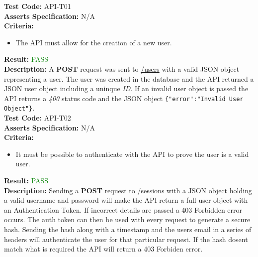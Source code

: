 \documentclass[11pt,a4paper]{report}
\begin{document}
\label{test:API-T01}
\noindent\textbf{Test Code:} API-T01\\
\textbf{Asserts Specification:} N/A \\ 
\textbf{Criteria:} \begin{itemize}
                     \item The API must allow for the creation of a new user.
                   \end{itemize}  
\textbf{Result:} \textcolor{green}{PASS}\\ 
\textbf{Description:} A \textbf{POST} request was sent to \url{/users} with a valid JSON object representing a user. The user was created in the database and the API returned a JSON user object including a uninque \textit{ID}. If an invalid user object is passed the API returns a \textit{400} status code and the JSON object \lstinline${"error":"Invalid User Object"}$.\\ 

\label{test:API-T02}
\noindent\textbf{Test Code:} API-T02\\
\textbf{Asserts Specification:} N/A \\ 
\textbf{Criteria:} \begin{itemize}
                     \item It must be possible to authenticate with the API to prove the user is a valid user. 
                   \end{itemize}  
\textbf{Result:} \textcolor{green}{PASS}\\ 
\textbf{Description:} Sending a \textbf{POST} request to \url{/sessions} with a JSON object holding a valid username and password will make the API return a full user object with an Authentication Token. If incorrect details are passed a 403 Forbidden error occurs. The auth token can then be used with every request to generate a secure hash. Sending the hash along with a timestamp and the users email in a series of headers will authenticate the user for that particular request. If the hash dosent match what is required the API will return a 403 Forbiden error. \\ 
\end{document}
